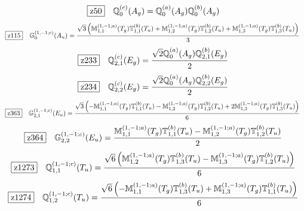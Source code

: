 \documentclass[fleqn,10pt,landscape]{jsarticle}
\begin{document}
\begin{dmath*}
\hspace*{3mm}\fbox{z50}\quad \mathbb{Q}_{0}^{(c)}(A_{g})=\mathbb{Q}_{0}^{(a)}(A_{g}) \mathbb{Q}_{0}^{(b)}(A_{g})
\end{dmath*}
\begin{dmath*}
\hspace*{3mm}\fbox{z115}\quad \mathbb{G}_{0}^{(1,-1;c)}(A_{u})=\frac{\sqrt{3} \left(\mathbb{M}_{1,1}^{(1,-1;a)}(T_{g}) \mathbb{T}_{1,1}^{(b)}(T_{u}) + \mathbb{M}_{1,2}^{(1,-1;a)}(T_{g}) \mathbb{T}_{1,2}^{(b)}(T_{u}) + \mathbb{M}_{1,3}^{(1,-1;a)}(T_{g}) \mathbb{T}_{1,3}^{(b)}(T_{u})\right)}{3}
\end{dmath*}
\begin{dmath*}
\hspace*{3mm}\fbox{z233}\quad \mathbb{Q}_{2,1}^{(c)}(E_{g})=\frac{\sqrt{2} \mathbb{Q}_{0}^{(a)}(A_{g}) \mathbb{Q}_{2,1}^{(b)}(E_{g})}{2}
\end{dmath*}
\begin{dmath*}
\hspace*{3mm}\fbox{z234}\quad \mathbb{Q}_{2,2}^{(c)}(E_{g})=\frac{\sqrt{2} \mathbb{Q}_{0}^{(a)}(A_{g}) \mathbb{Q}_{2,2}^{(b)}(E_{g})}{2}
\end{dmath*}
\begin{dmath*}
\hspace*{3mm}\fbox{z363}\quad \mathbb{G}_{2,1}^{(1,-1;c)}(E_{u})=\frac{\sqrt{3} \left(- \mathbb{M}_{1,1}^{(1,-1;a)}(T_{g}) \mathbb{T}_{1,1}^{(b)}(T_{u}) - \mathbb{M}_{1,2}^{(1,-1;a)}(T_{g}) \mathbb{T}_{1,2}^{(b)}(T_{u}) + 2 \mathbb{M}_{1,3}^{(1,-1;a)}(T_{g}) \mathbb{T}_{1,3}^{(b)}(T_{u})\right)}{6}
\end{dmath*}
\begin{dmath*}
\hspace*{3mm}\fbox{z364}\quad \mathbb{G}_{2,2}^{(1,-1;c)}(E_{u})=\frac{\mathbb{M}_{1,1}^{(1,-1;a)}(T_{g}) \mathbb{T}_{1,1}^{(b)}(T_{u}) - \mathbb{M}_{1,2}^{(1,-1;a)}(T_{g}) \mathbb{T}_{1,2}^{(b)}(T_{u})}{2}
\end{dmath*}
\begin{dmath*}
\hspace*{3mm}\fbox{z1273}\quad \mathbb{Q}_{1,1}^{(1,-1;c)}(T_{u})=\frac{\sqrt{6} \left(\mathbb{M}_{1,2}^{(1,-1;a)}(T_{g}) \mathbb{T}_{1,3}^{(b)}(T_{u}) - \mathbb{M}_{1,3}^{(1,-1;a)}(T_{g}) \mathbb{T}_{1,2}^{(b)}(T_{u})\right)}{6}
\end{dmath*}
\begin{dmath*}
\hspace*{3mm}\fbox{z1274}\quad \mathbb{Q}_{1,2}^{(1,-1;c)}(T_{u})=\frac{\sqrt{6} \left(- \mathbb{M}_{1,1}^{(1,-1;a)}(T_{g}) \mathbb{T}_{1,3}^{(b)}(T_{u}) + \mathbb{M}_{1,3}^{(1,-1;a)}(T_{g}) \mathbb{T}_{1,1}^{(b)}(T_{u})\right)}{6}
\end{dmath*}
\end{document}
